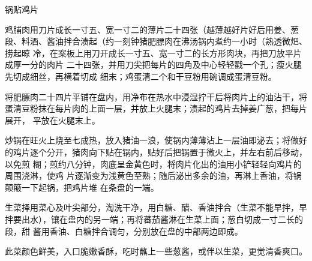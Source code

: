 \begin{recipe}{锅贴鸡片}

\ingredients


\preparation

\step 鸡脯肉用刀片成长一寸五、宽一寸二的薄片二十四张（越薄越好片好后用姜、葱
段、料酒、酱油拌合渍起（约一刻钟猪肥膘肉在沸汤锅内煮约一小时（熟透微𤆵、捞起晾
冷，在案板上用刀开成长一寸五、宽一寸二的长方形肉块，再把刀放平片成厚一分的肉片
二十四张，并用刀尖把每片的四角及中心轻轻戳一个孔；瘦火腿先切成细丝，再横着切成
细末；鸡蛋清二个和干豆粉用碗调成蛋清豆粉。

\step 将肥膘肉二十四片平铺在盘内，用净布在热水中浸湿拧干后将肉片上的油沾干，将
蛋清豆粉抹在每片肉的上面一层，并放上火腿末；渍起的鸡片去掉姜广葱，把每片展开，
平放在火腿末上。

\step 炒锅在旺火上烧至七成热，放入猪油一浪，使锅内薄薄沾上一层油即泌去；将做好
的鸡片逐个分开，猪肉向下贴在锅内，贴好后把锅置于微火上，并左右前后移动，以免煎
糊；煎约八分钟，肉底呈金黄色时，将肉片化出的油用小铲轻轻向鸡片的周围浇淋，使鸡
片逐渐变为浅黄色至熟；随后泌出多余的油，再淋上香油，将锅颠簸一下起锅，把鸡片堆
在条盘的一端。

\step 生菜择用菜心及叶尖部分，淘洗干净，用白糖、醋、香油拌合（生菜不能早拌，早
拌要出水），镶在盘内的另一端；再将蕃茄酱淋在生菜上面；葱白切成一寸二长的段，甜
酱用香油、白糖拌合调匀，分别放在盘的中部两边即成。

\features

此菜颜色鲜美，入口脆嫩香酥，吃时蘸上一些葱酱，或伴以生菜，更觉清香爽口。

\end{recipe}

